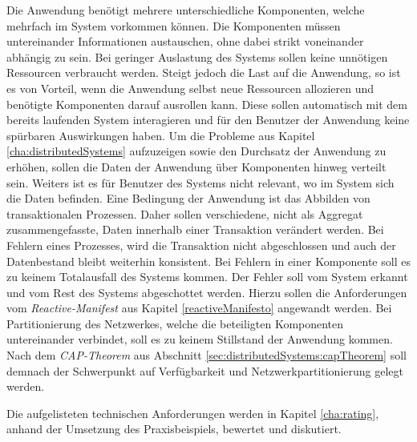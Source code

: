 \begin{enumerate}
  Die Anwendung benötigt mehrere unterschiedliche Komponenten, welche mehrfach im System vorkommen können. Die Komponenten müssen untereinander Informationen austauschen, ohne dabei strikt voneinander abhängig zu sein.
  Bei geringer Auslastung des Systems sollen keine unnötigen Ressourcen verbraucht werden. Steigt jedoch die Last auf die Anwendung, so ist es von Vorteil, wenn die Anwendung selbst neue Ressourcen allozieren und benötigte Komponenten darauf ausrollen kann. Diese sollen automatisch mit dem bereits laufenden System interagieren und für den Benutzer der Anwendung keine spürbaren Auswirkungen haben.
  Um die Probleme aus Kapitel \ref{cha:distributedSystems} aufzuzeigen sowie den Durchsatz der Anwendung zu erhöhen, sollen die Daten der Anwendung über Komponenten hinweg verteilt sein. Weiters ist es für Benutzer des Systems nicht relevant, wo im System sich die Daten befinden. 
  Eine Bedingung der Anwendung ist das Abbilden von transaktionalen Prozessen. Daher sollen verschiedene, nicht als Aggregat zusammengefasste, Daten innerhalb einer Transaktion verändert werden. Bei Fehlern eines Prozesses, wird die Transaktion nicht abgeschlossen und auch der Datenbestand bleibt weiterhin konsistent.
  Bei Fehlern in einer Komponente soll es zu keinem Totalausfall des Systems kommen. Der Fehler soll vom System erkannt und vom Rest des Systems abgeschottet werden. Hierzu sollen die Anforderungen vom \textit{Reactive-Manifest} aus Kapitel \ref{reactiveManifesto} angewandt werden.
  Bei Partitionierung des Netzwerkes, welche die beteiligten Komponenten untereinander verbindet, soll es zu keinem Stillstand der Anwendung kommen. Nach dem \textit{CAP-Theorem} aus Abschnitt \ref{sec:distributedSystems:capTheorem} soll demnach der Schwerpunkt auf Verfügbarkeit und Netzwerkpartitionierung gelegt werden. 
\end{enumerate}
Die aufgelisteten technischen Anforderungen werden in Kapitel \ref{cha:rating}, anhand der Umsetzung des Praxisbeispiels, bewertet und diskutiert. 

